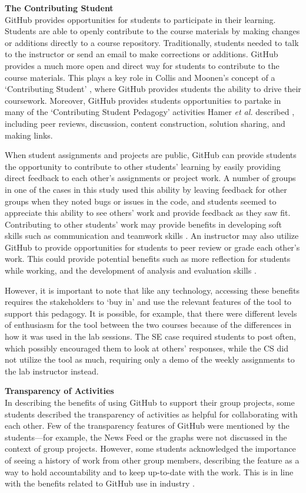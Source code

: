\textbf{The Contributing Student} \\
GitHub provides opportunities for students to participate in their learning. Students are able to openly contribute to the course materials by making changes or additions directly to a course repository. Traditionally, students needed to talk to the instructor or send an email to make corrections or additions. GitHub provides a much more open and direct way for students to contribute to the course materials. This plays a key role in Collis and Moonen's concept of a `Contributing Student' \cite{collis2006contributing}, where GitHub provides students the ability to drive their coursework. Moreover, GitHub provides students opportunities to partake in many of the `Contributing Student Pedagogy' activities Hamer \textit{et al.} described \cite{hamer2011tools}, including peer reviews, discussion, content construction, solution sharing, and making links.

When student assignments and projects are public, GitHub can provide students the opportunity to contribute to other students' learning by easily providing direct feedback to each other's assignments or project work. A number of groups in one of the cases in this study used this ability by leaving feedback for other groups when they noted bugs or issues in the code, and students seemed to appreciate this ability to see others' work and provide feedback as they saw fit. Contributing to other students' work may provide benefits in developing soft skills such as communication and teamwork skills \cite{hamer2006some}. An instructor may also utilize GitHub to provide opportunities for students to peer review or grade each other's work. This could provide potential benefits such as more reflection for students while working, and the development of analysis and evaluation skills \cite{sondergaard2012collaborative}.

However, it is important to note that like any technology, accessing these benefits requires the stakeholders to `buy in' and use the relevant features of the tool to support this pedagogy. It is possible, for example, that there were different levels of enthusiasm for the tool between the two courses because of the differences in how it was used in the lab sessions. The SE case required students to post often, which possibly encouraged them to look at others' responses, while the CS did not utilize the tool as much, requiring only a demo of the weekly assignments to the lab instructor instead.

\textbf{Transparency of Activities} \\
In describing the benefits of using GitHub to support their group projects, some students described the transparency of activities as helpful for collaborating with each other. Few of the transparency features of GitHub were mentioned by the students---for example, the News Feed or the graphs were not discussed in the context of group projects. However, some students acknowledged the importance of seeing a history of work from other group members, describing the feature as a way to hold accountability and to keep up-to-date with the work. This is in line with the benefits related to GitHub use in industry \cite{dabbish2012social}.

